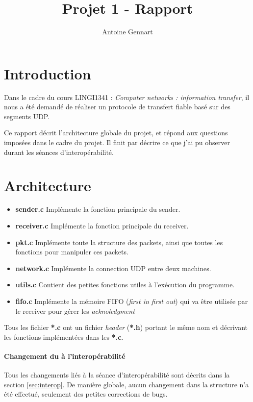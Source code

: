 \documentclass[10pt,a4paper]{article}
\author{Antoine Gennart}
\title{Projet 1 - Rapport}
\begin{document}
\maketitle


\section{Introduction}
Dans le cadre du cours LINGI1341 : \textit{Computer networks : information transfer}, il nous a été demandé de réaliser un protocole de transfert fiable basé sur des segments UDP.

Ce rapport décrit l'architecture globale du projet, et répond aux questions imposées dans le cadre du projet. Il finit par décrire ce que j'ai pu observer durant les séances d'interopérabilité.

\section{Architecture}

\begin{itemize}
	\item \textbf{sender.c} Implémente la fonction principale du sender.
	\item \textbf{receiver.c} Implémente la fonction principale du receiver.
	\item \textbf{pkt.c} Implémente toute la structure des packets, ainsi que toutes les fonctions pour manipuler ces packets.
	\item \textbf{network.c} Implémente la connection UDP entre deux machines.
	\item \textbf{utils.c} Contient des petites fonctions utiles à l'exécution du programme.
	\item \textbf{fifo.c} Implémente la mémoire FIFO (\textit{first in first out}) qui va être utilisée par le receiver pour gérer les \textit{acknoledgment}
\end{itemize}

Tous les fichier \textbf{*.c} ont un fichier \textit{header} (\textbf{*.h}) portant le même nom et décrivant les fonctions implémentées dans les \textbf{*.c}.

\paragraph{Changement du à l'interopérabilité} Tous les changements liés à la séance d'interopérabilité sont décrits dans la section \ref{sec:interop}. De manière globale, aucun  changement dans la structure n'a été effectué, seulement des petites corrections de bugs.
\end{document}

